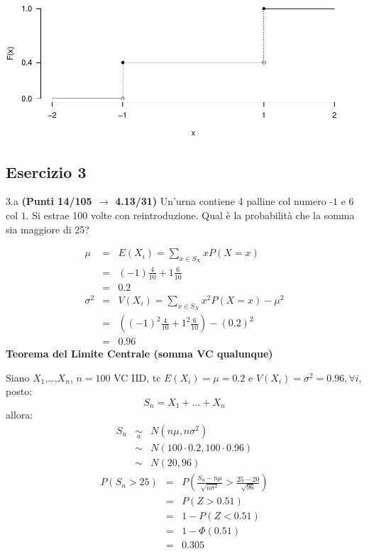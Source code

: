 \documentclass[
  11pt,
]{book}
\theoremstyle{mytheoremstyle}
\theoremstyle{mydefstyle}
\newenvironment{sol}
  {
  \begin{tcolorbox}[enhanced,breakable,arc=0.1mm,boxrule=1pt,colback=white,colframe=iblue,
  title=\bf \fontfamily{lmss}\selectfont \hspace{.5 cm} Soluzione,drop fuzzy shadow]

}{
\end{tcolorbox}
  }
\begin{document}
\begin{sol}

\begin{center}\includegraphics{Esami_passati_con_soluzioni_files/figure-latex/2024-108-1} \end{center}

\end{sol}

\subsection{Esercizio 3}\label{esercizio-3-39}

3.a \textbf{(Punti 14/105 \(\rightarrow\) 4.13/31)} Un'urna contiene 4 palline col numero \(\mbox{-1}\) e 6 col \(\mbox{1}\).
Si estrae 100 volte con reintroduzione.
Qual è la probabilità che la somma sia maggiore di 25?

\begin{sol}
\begin{eqnarray*} \mu &=& E(X_i) = \sum_{x\in S_X}x P(X=x)\\ 
 &=& ( -1 ) \frac { 4 }{ 10 }+ 1  \frac { 6 }{ 10 } \\ 
            &=& 0.2 \\ 
 \sigma^2 &=& V(X_i) = \sum_{x\in S_X}x^2 P(X=x)-\mu^2\\ 
 &=&\left( ( -1 ) ^2\frac { 4 }{ 10 }+ 1  ^2\frac { 6 }{ 10 } \right)-( 0.2 )^2\\ 
            &=& 0.96 
\end{eqnarray*}
\textbf{Teorema del Limite Centrale (somma VC qualunque)}

Siano \(X_1\),\ldots,\(X_n\), \(n=100\) VC IID, tc \(E(X_i)=\mu=0.2\) e \(V(X_i)=\sigma^2=0.96,\forall i\), posto:
\[
      S_n = X_1 + ... + X_n
      \]
allora:\begin{eqnarray*}
  S_n & \mathop{\sim}\limits_{a}& N(n\mu,n\sigma^2) \\
     &\sim & N(100\cdot0.2,100\cdot0.96) \\
     &\sim & N(20,96) 
  \end{eqnarray*}\begin{eqnarray*}
      P( S_n   >   25 ) 
        &=& P\left(  \frac { S_n  -  n\mu }{ \sqrt{n\sigma^2} }  >  \frac { 25  -  20 }{\sqrt{ 96 }} \right)  \\
                 &=& P\left(  Z   >   0.51 \right) \\    &=& 1-P(Z< 0.51 )\\ 
                 &=&  1-\Phi( 0.51 ) \\ &=&  0.305 
      \end{eqnarray*}

\end{sol}
\end{document}
